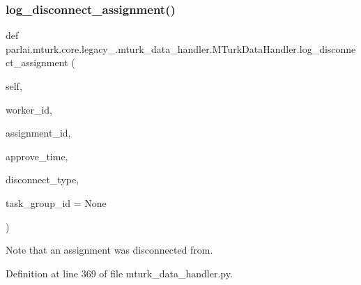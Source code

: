 \subsubsection{\texorpdfstring{log\+\_\+disconnect\+\_\+assignment()}{log\_disconnect\_assignment()}}
{\footnotesize\ttfamily def parlai.\+mturk.\+core.\+legacy\+\_.\+mturk\+\_\+data\+\_\+handler.\+M\+Turk\+Data\+Handler.\+log\+\_\+disconnect\+\_\+assignment (\begin{DoxyParamCaption}\item[{}]{self,  }\item[{}]{worker\+\_\+id,  }\item[{}]{assignment\+\_\+id,  }\item[{}]{approve\+\_\+time,  }\item[{}]{disconnect\+\_\+type,  }\item[{}]{task\+\_\+group\+\_\+id = {\ttfamily None} }\end{DoxyParamCaption})}

\begin{DoxyVerb}Note that an assignment was disconnected from.
\end{DoxyVerb}
 

Definition at line 369 of file mturk\+\_\+data\+\_\+handler.\+py.



